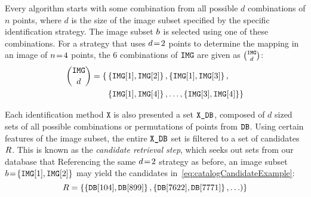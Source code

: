 Every algorithm starts with some combination from all possible $d$ combinations of $n$ points, where $d$ is the size of the image subset specified by the specific identification strategy.
The image subset $b$ is selected using one of these combinations.
For a strategy that uses $d\!=\!2$ points to determine the mapping in an image of $n\!=\! 4$ points, the 6 combinations of $\texttt{IMG}$ are given as $\binom{\texttt{IMG}}{d}$:
\begin{equation}
    \begin{aligned}
	    \binom{\texttt{IMG}}{d} = \{&
	    	\left\{ \texttt{IMG}[1], \texttt{IMG}[2] \right\},
	    	\left\{ \texttt{IMG}[1], \texttt{IMG}[3] \right\}, \\
	       &\left\{ \texttt{IMG}[1], \texttt{IMG}[4] \right\}, \ldots,
	        \left\{ \texttt{IMG}[3], \texttt{IMG}[4] \right\}
	        \}
    \end{aligned}
\end{equation}

Each identification method $\texttt{X}$ is also presented a set $\texttt{X\_DB}$, composed of $d$ sized sets of all possible combinations or permutations of points from $\texttt{DB}$.
Using certain features of the image subset, the entire $\texttt{X\_DB}$ set is filtered to a set of candidates $R$.
This is known as the \emph{candidate retrieval step}, which seeks out sets from our database that 
Referencing the same $d\!=\! 2$ strategy as before, an image subset $b \!=\! \left\{ \texttt{IMG}[1], \texttt{IMG}[2] \right\}$ may yield the candidates in~\autoref{eq:catalogCandidateExample}:
\begin{equation}
	\label{eq:catalogCandidateExample}
    \databasesubset = \set{ \set{\vv{\databaseset[104]}, \vv{\databaseset[899]}}, \set{\vv{\databaseset[7622]}, \vv{\databaseset[7771]}}, \ldots) } 
\end{equation}

